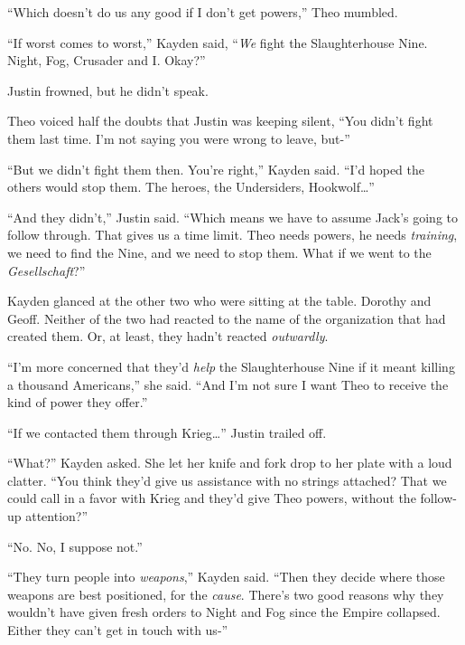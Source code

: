 ``Which doesn't do us any good if I don't get powers,'' Theo mumbled.



``If worst comes to worst,'' Kayden said, ``\emph{We} fight the Slaughterhouse Nine.  Night, Fog, Crusader and I.  Okay?''



Justin frowned, but he didn't speak.



Theo voiced half the doubts that Justin was keeping silent, ``You didn't fight them last time.  I'm not saying you were wrong to leave, but-''



``But we didn't fight them then.  You're right,'' Kayden said.  ``I'd hoped the others would stop them.  The heroes, the Undersiders, Hookwolf\ldots''



``And they didn't,'' Justin said.  ``Which means we have to assume Jack's going to follow through.  That gives us a time limit.  Theo needs powers, he needs \emph{training}, we need to find the Nine, and we need to stop them.  What if we went to the \emph{Gesellschaft}?''



Kayden glanced at the other two who were sitting at the table.  Dorothy and Geoff.  Neither of the two had reacted to the name of the organization that had created them.  Or, at least, they hadn't reacted \emph{outwardly}.



``I'm more concerned that they'd \emph{help} the Slaughterhouse Nine if it meant killing a thousand Americans,'' she said.  ``And I'm not sure I want Theo to receive the kind of power they offer.''



``If we contacted them through Krieg\ldots''  Justin trailed off.



``What?'' Kayden asked.  She let her knife and fork drop to her plate with a loud clatter.  ``You think they'd give us assistance with no strings attached?  That we could call in a favor with Krieg and they'd give Theo powers, without the follow-up attention?''



``No.  No, I suppose not.''



``They turn people into\emph{ weapons},'' Kayden said.  ``Then they decide where those weapons are best positioned, for the \emph{cause}.  There's two good reasons why they wouldn't have given fresh orders to Night and Fog since the Empire collapsed.  Either they can't get in touch with us-''




